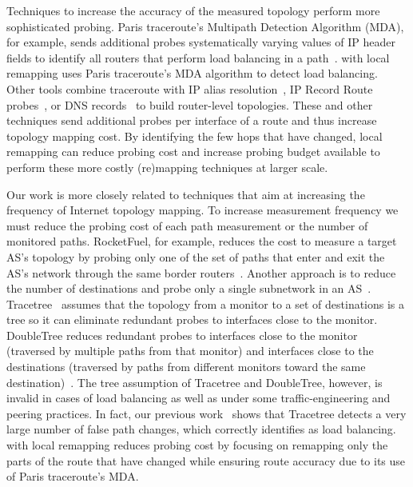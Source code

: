 Techniques to increase the accuracy of the measured topology perform
more sophisticated probing.  Paris traceroute's Multipath Detection
Algorithm (MDA), for example, sends additional probes systematically
varying values of IP header fields to identify all routers that perform
load balancing in a path~\cite{veitch09balancer}.  \dtrack{} with local
remapping uses Paris traceroute's MDA algorithm to detect load
balancing.  Other tools combine traceroute with IP alias
resolution~\cite{gj13pamplona, keys13midar}, IP Record Route
probes~\cite{sherwood08discarte}, or DNS records~\cite{ferguson13dns} to
build router-level topologies.  These and other techniques send
additional probes per interface of a route and thus increase topology
mapping cost.  By identifying the few hops that have changed, local
remapping can reduce probing cost and increase probing budget available
to perform these more costly (re)mapping techniques at larger scale.

Our work is more closely related to techniques that aim at increasing the
frequency of Internet topology mapping. To increase measurement
frequency we must reduce the probing cost of each path measurement or
the number of monitored paths.  RocketFuel, for example, reduces the
cost to measure a target AS's topology by probing only one of the set of
paths that enter and exit the AS's network through the same border
routers~\cite{spring02rocketfuel}.  Another approach is to reduce the
number of destinations and probe only a single subnetwork in an
AS~\cite{beverly10hifreq}.  Tracetree~\cite{latapy08radar} assumes that
the topology from a monitor to a set of destinations is a tree so it can
eliminate redundant probes to interfaces close to the monitor.
DoubleTree reduces redundant probes to interfaces close to the monitor
(traversed by multiple paths from that monitor) and interfaces close to
the destinations (traversed by paths from different monitors toward the
same destination)~\cite{donnet05topology}. The tree assumption of
Tracetree and DoubleTree, however, is invalid in cases of load balancing
as well as under some traffic-engineering and peering practices. In
fact, our previous work~\cite{cunha11dtrack} shows that Tracetree
detects a very large number of false path changes, which \dtrack{} correctly
identifies as load balancing. \dtrack{} with local remapping reduces
probing cost by focusing on remapping only the parts of the route that
have changed while ensuring route accuracy due to its use of Paris
traceroute's MDA.


